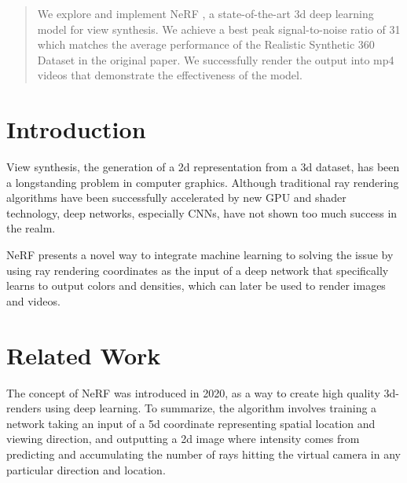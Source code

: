 \author{Andrew Ding, Tony Zhu, Mingxuan Ji\\
Brown University\\
}

\maketitle

\begin{abstract}

We explore and implement NeRF \cite{nerf}, a state-of-the-art 3d deep learning model for view synthesis. We achieve a best peak signal-to-noise ratio of 31 which matches the average performance of the Realistic Synthetic 360{\textdegree} Dataset in the original paper. We successfully render the output into mp4 videos that demonstrate the effectiveness of  the model.

\end{abstract}

\section{Introduction}

View synthesis, the generation of a 2d representation from a 3d dataset, has been a longstanding problem in computer graphics. Although traditional ray rendering algorithms have been successfully accelerated by new GPU and shader technology, deep networks, especially CNNs, have not shown too much success in the realm. 

NeRF presents a novel way to integrate machine learning to solving the issue by using ray rendering coordinates as the input of a deep network that specifically learns to output colors and densities, which can later be used to render images and videos.

\section{Related Work}

The concept of NeRF \cite{nerf} was introduced in 2020, as a way to create high quality 3d-renders using deep learning. To summarize, the algorithm involves training a network taking an input of a 5d coordinate representing spatial location and viewing direction, and outputting a 2d image where intensity comes from predicting and accumulating the number of rays hitting the virtual camera in any particular direction and location.

